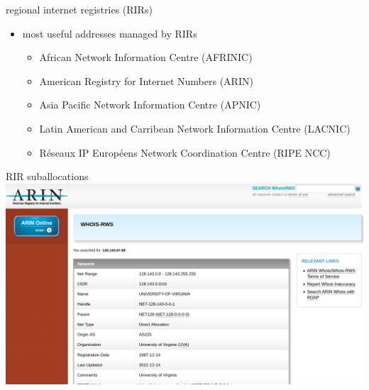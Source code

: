 \begin{frame}{regional internet registries (RIRs)}
\begin{itemize}
\item most useful addresses managed by RIRs
    \begin{itemize}
    \item African Network Information Centre (AFRINIC)
    \item American Registry for Internet Numbers (ARIN)
    \item Asia Pacific Network Information Centre (APNIC)
    \item Latin American and Carribean Network Information Centre (LACNIC)
    \item R\'eseaux IP Europ\'eens Network Coordination Centre (RIPE NCC)
    \end{itemize}
\end{itemize}
\end{frame}

\begin{frame}{RIR suballocations}
\includegraphics[width=\textwidth]{../arp/arin-whois-virginia}
\end{frame}

